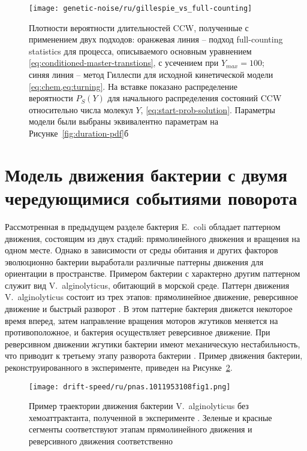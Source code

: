 \begin{figure}[ht]
    \centering
    \texttt{[image: genetic-noise/ru/gillespie\_vs\_full-counting]}
    \caption{
        Плотности вероятности длительностей CCW, полученные с применением двух подходов: оранжевая линия -- подход full-counting statistics для процесса, описываемого основным уравнением \cref{eq:conditioned-master-transtions}, с усечением при $Y_{max} = 100$; синяя линия -- метод Гиллеспи \cite{gillespie_stochastic_2007} для исходной кинетической модели \cref{eq:chem,eq:turning}. На вставке показано распределение вероятности $P_S(Y)$ для начального распределения состояний CCW относительно числа молекул $Y$, \cref{eq:start-prob-solution}. Параметры модели были выбраны эквивалентно параметрам на Рисунке~\cref{fig:duration-pdf}б
    }
    \label{fig:gillespi-vs-direct}
\end{figure}

\section{Модель движения бактерии с двумя чередующимися событиями поворота}\label{sec:ch2/sec2}

Рассмотренная в предыдущем разделе бактерия E.~coli обладает паттерном движения, состоящим из двух стадий: прямолинейного движения и вращения на одном месте. Однако в зависимости от среды обитания и других факторов эволюционно бактерии выработали различные паттерны движения для ориентации в пространстве. Примером бактерии с характерно другим паттерном служит вид V.~alginolyticus, обитающий в морской среде. Паттерн движения V.~alginolyticus состоит из трех этапов: прямолинейное движение, реверсивное движение и быстрый разворот \cite{xie_bacterial_2011}. В этом паттерне бактерия движется некоторое время вперед, затем направление вращения моторов жгутиков меняется на противоположное, и бактерия осуществляет реверсивное движение. При реверсивном движении жгутики бактерии имеют механическую нестабильность, что приводит к третьему этапу разворота бактерии \cite{taute_high-throughput_2015}. Пример движения бактерии, реконструированного в эксперименте, приведен на Рисунке~\cref{fig:vibrio-trajectories}.

\begin{figure}[ht]
    \centering
    \texttt{[image: drift-speed/ru/pnas.1011953108fig1.png]}
    \caption{
        Пример траектории движения бактерии V.~alginolyticus без хемоаттрактанта, полученной в эксперименте
        \cite{xie_bacterial_2011}. Зеленые и красные сегменты соответствуют этапам прямолинейного движения и реверсивного движения соответственно
    }
    \label{fig:vibrio-trajectories}
\end{figure}

